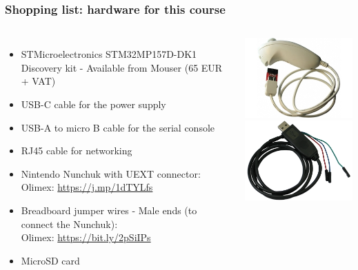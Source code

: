 \begin{frame}
\frametitle{Shopping list: hardware for this course}
  \begin{columns}
    \footnotesize
    \begin{itemize}
    \item STMicroelectronics STM32MP157D-DK1 Discovery kit -
      Available from Mouser (65 EUR + VAT)
    \item USB-C cable for the power supply
    \item USB-A to micro B cable for the serial console
    \item RJ45 cable for networking
    \item Nintendo Nunchuk with UEXT connector: \\
      Olimex: \url{https://j.mp/1dTYLfs}
    \item Breadboard jumper wires - Male ends (to connect the Nunchuk): \\
      Olimex: \url{https://bit.ly/2pSiIPs}
    \item MicroSD card
    \end{itemize}
    \includegraphics[height=0.25\textheight]{common/nunchuk.jpg} \\
    \includegraphics[height=0.20\textheight]{common/usb-serial-cable-female.png} \\

\end{columns}
\end{frame}
